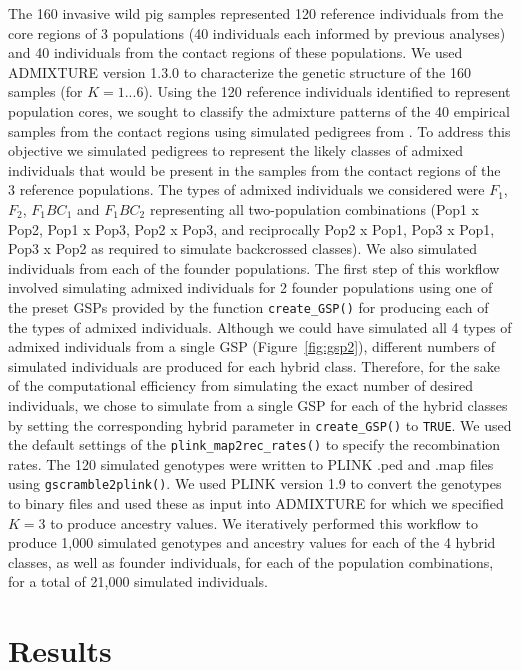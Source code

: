 {The 160 invasive wild pig samples represented 120 reference individuals from the core regions of
3 populations (40 individuals each informed by previous analyses) 
and 40 individuals from the contact regions of these populations.
We used ADMIXTURE version 1.3.0 \citep{alexander2009fast} to characterize the genetic structure 
of the 160 samples (for $K = {1...6}$). Using the 120 reference individuals identified to represent population cores, 
we sought to classify the admixture patterns of the 40 empirical samples
from the contact regions using simulated pedigrees from \gscramble{}. To address this objective we simulated
pedigrees to represent the likely classes of admixed individuals that would be present in the samples
from the contact regions of the 3 reference populations. The types of admixed individuals we considered were 
$F_1$, $F_2$, $F_{1}BC_1$ and $F_{1}BC_2$ representing all two-population combinations 
(Pop1 x Pop2, Pop1 x Pop3, Pop2 x Pop3, and reciprocally Pop2 x Pop1, Pop3 x Pop1, Pop3 x Pop2 as required 
to simulate backcrossed classes). 
We also simulated individuals from each of the founder populations. The first step of this workflow involved
simulating admixed individuals for 2 founder populations using one of the preset \gscramble{}
GSPs provided by the function {\footnotesize\tt create\_GSP()} for producing each of the types of admixed
individuals. Although we could have simulated all 4 types of admixed individuals from a single GSP (Figure~\ref{fig:gsp2}),
different numbers of simulated individuals are produced for each hybrid class. Therefore, for the sake of the
computational efficiency from simulating the exact number of desired individuals, we chose to simulate from
a single GSP for each of the hybrid classes by setting the corresponding hybrid parameter in {\footnotesize\tt create\_GSP()} to {\footnotesize\tt TRUE}. We used the default settings of the {\footnotesize\tt plink\_map2rec\_rates()} to specify the recombination rates. The 120 simulated genotypes were written to PLINK .ped and .map files using {\footnotesize\tt gscramble2plink()}. We used PLINK version 1.9 \citep{purcell2007plink} to convert the genotypes to binary files and used these as input into ADMIXTURE for which we specified $K=3$ to produce ancestry values. We iteratively
performed this workflow to produce 1,000 simulated genotypes and ancestry values for each of the
4 hybrid classes, as well as founder individuals, for each of the population combinations, for a total of
21,000 simulated individuals.

\section*{Results}

}
